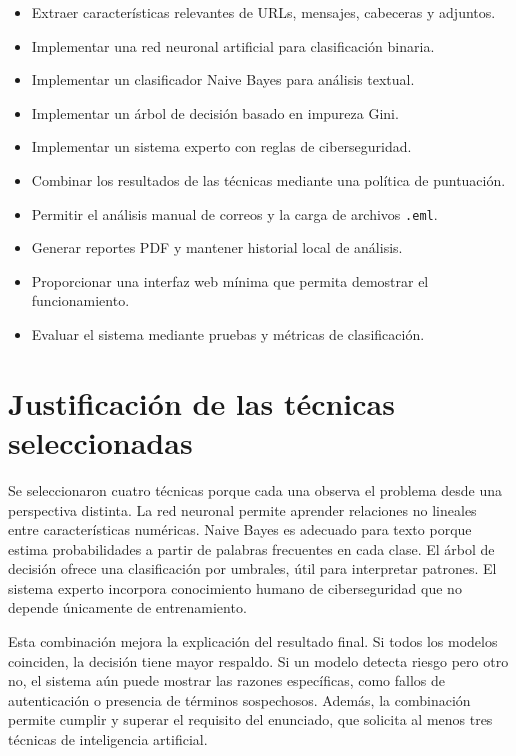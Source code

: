 \documentclass[12pt,letterpaper]{article}
\begin{document}
\begin{itemize}
    \item Extraer características relevantes de URLs, mensajes, cabeceras y adjuntos.
    \item Implementar una red neuronal artificial para clasificación binaria.
    \item Implementar un clasificador Naive Bayes para análisis textual.
    \item Implementar un árbol de decisión basado en impureza Gini.
    \item Implementar un sistema experto con reglas de ciberseguridad.
    \item Combinar los resultados de las técnicas mediante una política de puntuación.
    \item Permitir el análisis manual de correos y la carga de archivos \texttt{.eml}.
    \item Generar reportes PDF y mantener historial local de análisis.
    \item Proporcionar una interfaz web mínima que permita demostrar el funcionamiento.
    \item Evaluar el sistema mediante pruebas y métricas de clasificación.
\end{itemize}

\section{Justificación de las técnicas seleccionadas}

Se seleccionaron cuatro técnicas porque cada una observa el problema desde una perspectiva distinta. La red neuronal permite aprender relaciones no lineales entre características numéricas. Naive Bayes es adecuado para texto porque estima probabilidades a partir de palabras frecuentes en cada clase. El árbol de decisión ofrece una clasificación por umbrales, útil para interpretar patrones. El sistema experto incorpora conocimiento humano de ciberseguridad que no depende únicamente de entrenamiento.

Esta combinación mejora la explicación del resultado final. Si todos los modelos coinciden, la decisión tiene mayor respaldo. Si un modelo detecta riesgo pero otro no, el sistema aún puede mostrar las razones específicas, como fallos de autenticación o presencia de términos sospechosos. Además, la combinación permite cumplir y superar el requisito del enunciado, que solicita al menos tres técnicas de inteligencia artificial.
\end{document}
